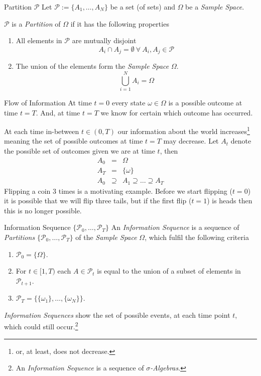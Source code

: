 \documentclass[11pt,a4paper]{article}
\begin{document}
  \begin{definition}{Partition $\mathcal{P}$}
    Let $\mathcal{P}:=\{A_1,\dots,A_N\}$ be a set (of sets) and $\Omega$ be a \textit{Sample Space}.
    \par $\mathcal{P}$ is a \textit{Partition} of $\Omega$ if it has the following properties
    \begin{enumerate}
      \item All elements in $\mathcal{P}$ are mutually disjoint
      \[ A_i\cap A_j=\emptyset\ \forall\ A_i,A_j\in\mathcal{P} \]
      \item The union of the elements form the \textit{Sample Space} $\Omega$.
      \[ \bigcup_{i=1}^NA_i=\Omega \]
    \end{enumerate}
  \end{definition}

  \begin{remark}{Flow of Information}
    At time $t=0$ every state $\omega\in\Omega$ is a possible outcome at time $t=T$. And, at time $t=T$ we know for certain which outcome has occurred.
    \par At each time in-between $t\in(0,T)$ our information about the world increases\footnote{or, at least, does not decrease.} meaning the set of possible outcomes at time $t=T$ may decrease. Let $A_t$ denote the possible set of outcomes given we are at time $t$, then
    \[\begin{array}{rcl}
      A_0&=&\Omega\\
      A_T&=&\{\omega\}\\
      A_0&\supseteq&A_1\supseteq\dots\supseteq A_T
    \end{array}\]
    Flipping a coin 3 times is a motivating example. Before we start flipping ($t=0$) it is possible that we will flip three tails, but if the first flip ($t=1$) is heads then this is no longer possible.
  \end{remark}

  \begin{definition}{Information Sequence $\{\mathcal{P}_0,\dots,\mathcal{P}_T\}$}
    An \textit{Information Sequence} is a sequence of \textit{Partitions} $\{\mathcal{P}_0,\dots,\mathcal{P}_T\}$ of the \textit{Sample Space} $\Omega$, which fulfil the following criteria
    \begin{enumerate}
      \item $\mathcal{P}_0=\big\{\Omega\big\}$.
      \item For $t\in[1,T)$ each $A\in\mathcal{P}_t$ is equal to the union of a subset of elements in $\mathcal{P}_{t+1}$.
      \item $\mathcal{P}_T=\big\{\{\omega_1\},\dots,\{\omega_N\}\big\}$.
    \end{enumerate}
    \textit{Information Sequences} show the set of possible events, at each time point $t$, which could still occur.\footnote{An \textit{Information Sequence} is a sequence of \textit{$\sigma$-Algebras}.}
  \end{definition}
\end{document}
